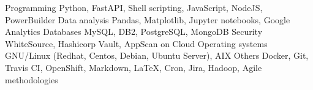 %
%
%

    \begin{keywords}
        \keywordsentry
            {Programming}
            {
                Python,
                FastAPI,
                Shell scripting,
                JavaScript,
                NodeJS,
                PowerBuilder
            }
        \keywordsentry
            {Data analysis}
            {
                Pandas,
                Matplotlib,
                Jupyter notebooks,
                Google Analytics
            }
        \keywordsentry
            {Databases}
            {
                MySQL,
                DB2,
                PostgreSQL,
                MongoDB
            }
        \keywordsentry
            {Security}
            {
                WhiteSource,
                Hashicorp Vault,
                AppScan on Cloud
            }
        \keywordsentry
            {Operating systems}
            {
                GNU/Linux (Redhat, Centos, Debian, Ubuntu Server),
                AIX
            }
        \keywordsentry
            {Others}
            {
            	Docker,
                Git,
                Travis CI,
                OpenShift,
                Markdown,
                \LaTeX,
                Cron,
                Jira,
                Hadoop,
                Agile methodologies
            }
    \end{keywords}
